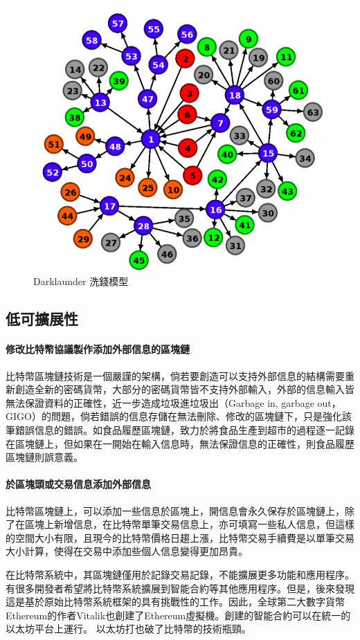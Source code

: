 			\begin{figure}[h]
				\centering
				\includegraphics[width = .7\textwidth]{Darklaunderworkflow.png}
				\caption{Darklaunder 洗錢模型\supercite{AnAnalysisofBitcoinLaundryServices}}\label{Darklaunderworkflow}
			\end{figure}

		\subsection{低可擴展性}
		\paragraph{修改比特幣協議製作添加外部信息的區塊鏈}比特幣區塊鏈技術是一個嚴謹的架構，倘若要創造可以支持外部信息的結構需要重新創造全新的密碼貨幣，大部分的密碼貨幣皆不支持外部輸入，外部的信息輸入皆無法保證資料的正確性，近一步造成垃圾進垃圾出（Garbage in, garbage out，GIGO）的問題，倘若錯誤的信息存儲在無法刪除、修改的區塊鏈下，只是強化該筆錯誤信息的錯誤。如食品履歷區塊鏈，致力於將食品生產到超市的過程逐一記錄在區塊鏈上，但如果在一開始在輸入信息時，無法保證信息的正確性，則食品履歷區塊鏈則誤意義。
		\paragraph{於區塊頭或交易信息添加外部信息} 比特幣區塊鏈上，可以添加一些信息於區塊上，開信息會永久保存於區塊鏈上，除了在區塊上新增信息，在比特幣單筆交易信息上，亦可填寫一些私人信息，但這樣的空間大小有限，且現今的比特幣價格日趨上漲，比特幣交易手續費是以單筆交易大小計算，使得在交易中添加些個人信息變得更加昂貴。

		在比特幣系統中，其區塊鏈僅用於記錄交易記錄，不能擴展更多功能和應用程序。有很多開發者希望將比特幣系統擴展到智能合約等其他應用程序。但是，後來發現這是基於原始比特幣系統框架的具有挑戰性的工作。因此，全球第二大數字貨幣Ethereum的作者Vitalik也創建了Ethereum虛擬機。創建的智能合約可以在統一的以太坊平台上運行。 以太坊打也破了比特幣的技術瓶頸。

